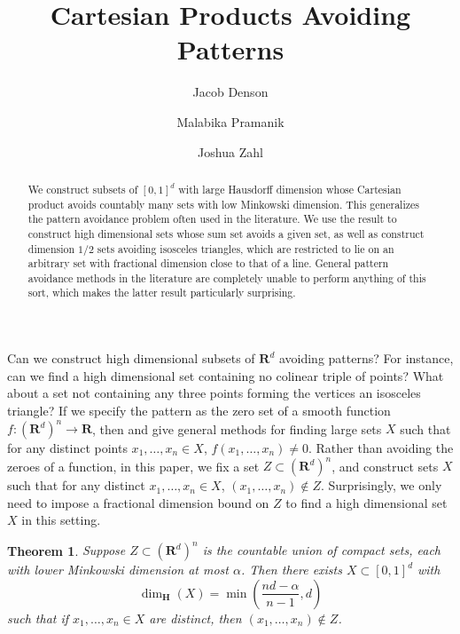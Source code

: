 \documentclass[usenames,dvipsnames]{article}
\title{Cartesian Products Avoiding Patterns}
\author{Jacob Denson\\ \and Malabika Pramanik\\ \and Joshua Zahl}
\theoremstyle{plain}
\theoremstyle{plain}
\newtheorem{theorem}{Theorem}
\begin{document}
\maketitle










\begin{abstract}
	We construct subsets of $[0,1]^d$ with large Hausdorff dimension whose Cartesian product avoids countably many sets with low Minkowski dimension. This generalizes the pattern avoidance problem often used in the literature. We use the result to construct high dimensional sets whose sum set avoids a given set, as well as construct dimension $1/2$ sets avoiding isosceles triangles, which are restricted to lie on an arbitrary set with fractional dimension close to that of a line. General pattern avoidance methods in the literature are completely unable to perform anything of this sort, which makes the latter result particularly surprising.
\end{abstract}










Can we construct high dimensional subsets of $\mathbf{R}^d$ avoiding patterns? For instance, can we find a high dimensional set containing no colinear triple of points? What about a set not containing any three points forming the vertices an isosceles triangle? If we specify the pattern as the zero set of a smooth function $f: (\mathbf{R}^d)^n \to \mathbf{R}$, then \cite{MalabikaRob} and \cite{Mathe} give general methods for finding large sets $X$ such that for any distinct points $x_1, \dots, x_n \in X$, $f(x_1, \dots, x_n) \neq 0$. Rather than avoiding the zeroes of a function, in this paper, we fix a set $Z \subset (\mathbf{R}^d)^n$, and construct sets $X$ such that for any distinct $x_1, \dots, x_n \in X$, $(x_1, \dots, x_n) \not \in Z$. Surprisingly, we only need to impose a fractional dimension bound on $Z$ to find a high dimensional set $X$ in this setting.

\begin{theorem}
	Suppose $Z \subset (\mathbf{R}^d)^n$ is the countable union of compact sets, each with lower Minkowski dimension at most $\alpha$. Then there exists $X \subset [0,1]^d$ with
	\[ \dim_{\mathbf{H}}(X) = \min \left( \frac{nd - \alpha}{n-1}, d \right) \]
	such that if $x_1, \dots, x_n \in X$ are distinct, then $(x_1, \dots, x_n) \not \in Z$.
\end{theorem}
\end{document}
